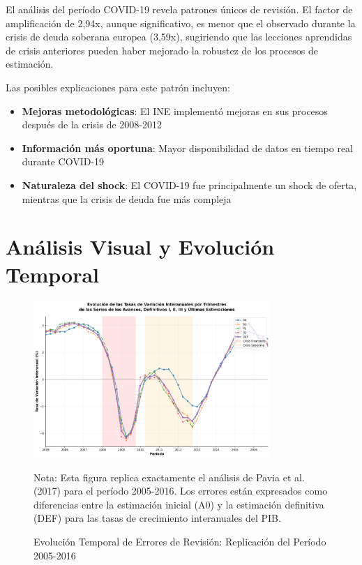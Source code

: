 \documentclass[12pt,a4paper]{article}
\begin{document}
El análisis del período COVID-19 revela patrones únicos de revisión. El factor de amplificación de 2,94x, aunque significativo, es menor que el observado durante la crisis de deuda soberana europea (3,59x), sugiriendo que las lecciones aprendidas de crisis anteriores pueden haber mejorado la robustez de los procesos de estimación.

Las posibles explicaciones para este patrón incluyen:

\begin{itemize}
\item \textbf{Mejoras metodológicas}: El INE implementó mejoras en sus procesos después de la crisis de 2008-2012
\item \textbf{Información más oportuna}: Mayor disponibilidad de datos en tiempo real durante COVID-19
\item \textbf{Naturaleza del shock}: El COVID-19 fue principalmente un shock de oferta, mientras que la crisis de deuda fue más compleja
\end{itemize}

\section{Análisis Visual y Evolución Temporal}

\begin{figure}[h]
\centering
\includegraphics[width=0.8\textwidth]{../figuras/figura_2_pavia_robusta_2005_2016.png}
\caption{Evolución Temporal de Errores de Revisión: Replicación del Período 2005-2016}
\label{fig:evolucion_2005_2016}
\begin{flushleft}
\footnotesize
Nota: Esta figura replica exactamente el análisis de Pavia et al. (2017) para el período 2005-2016. Los errores están expresados como diferencias entre la estimación inicial (A0) y la estimación definitiva (DEF) para las tasas de crecimiento interanuales del PIB.
\end{flushleft}
\end{figure}
\end{document}
